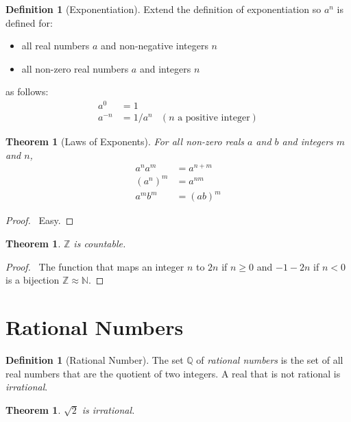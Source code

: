 \documentclass{book}
\let\qed\relax
\newtheorem{thm}[ax]{Theorem}
\theoremstyle{definition}
\newtheorem{df}[ax]{Definition}
\begin{document}
\begin{df}[Exponentiation]
Extend the definition of exponentiation so $a^n$ is defined for:
\begin{itemize}
\item all real numbers $a$ and non-negative integers $n$
\item all non-zero real numbers $a$ and integers $n$
\end{itemize}
as follows:
\begin{align*}
a^0 & = 1 \\
a^{-n} & = 1/a^n & (n \text{ a positive integer})
\end{align*}
\end{df}

\begin{thm}[Laws of Exponents]
For all non-zero reals $a$ and $b$ and integers $m$ and $n$,
\begin{align*}
a^n a^m & = a^{n+m} \\
(a^n)^m & = a^{nm} \\
a^m b^m & = (ab)^m
\end{align*}
\end{thm}

\begin{proof}
\pf\ Easy. \qed
\end{proof}

\begin{thm}
$\mathbb{Z}$ is countable.
\end{thm}

\begin{proof}
\pf\ The function that maps an integer $n$ to $2n$ if $n \geq 0$ and $-1-2n$ if $n < 0$ is a bijection $\mathbb{Z} \approx \mathbb{N}$. \qed
\end{proof}

\section{Rational Numbers}

\begin{df}[Rational Number]
The set $\mathbb{Q}$ of \emph{rational numbers} is the set of all real numbers that are the quotient of two integers. A real that is not rational is \emph{irrational}.
\end{df}

\begin{thm}
$\sqrt{2}$ is irrational.
\end{thm}
\end{document}
